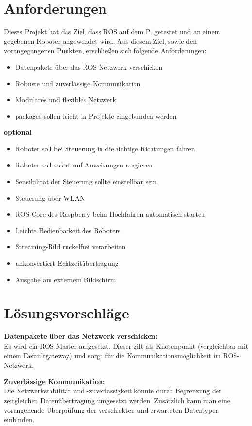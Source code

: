 \documentclass[12pt]{article}
\begin{document}
\section{Anforderungen}

Dieses Projekt hat das Ziel, dass ROS auf dem Pi getestet und an einem gegebenen Roboter angewendet wird. Aus diesem Ziel, sowie den vorangegangenen Punkten, erschließen sich folgende Anforderungen:
\vspace{0,4cm}
\begin{itemize}
\item Datenpakete über das ROS-Netzwerk verschicken
\item Robuste und zuverlässige Kommunikation
\item Modulares und flexibles Netzwerk
\item packages sollen leicht in Projekte eingebunden werden

\end{itemize}

{\bf optional}
\begin{itemize}

\item Roboter soll bei Steuerung in die richtige Richtungen fahren
\item Roboter soll sofort auf Anweisungen reagieren
\item Sensibilität der Steuerung sollte einstellbar sein
\item Steuerung über WLAN
\item ROS-Core des Raspberry beim Hochfahren automatisch starten
\item Leichte Bedienbarkeit des Roboters
\item Streaming-Bild ruckelfrei verarbeiten
\item unkonvertiert Echtzeitübertragung
\item Ausgabe am externem Bildschirm
\end{itemize}


\section{Lösungsvorschläge}

{\bf Datenpakete über das Netzwerk verschicken:}\\
Es wird ein ROS-Master aufgesetzt. Dieser gilt als Knotenpunkt (vergleichbar mit einem Defaultgateway) und sorgt für die Kommunikationsmöglichkeit im ROS-Netzwerk.

{\bf Zuverlässige Kommunikation:}\\
Die Netzwerkstabilität und -zuverlässigkeit könnte durch Begrenzung der zeitgleichen Datenübertragung umgesetzt werden. Zusätzlich kann man eine vorangehende Überprüfung der verschickten und erwarteten Datentypen einbinden.
\end{document}
